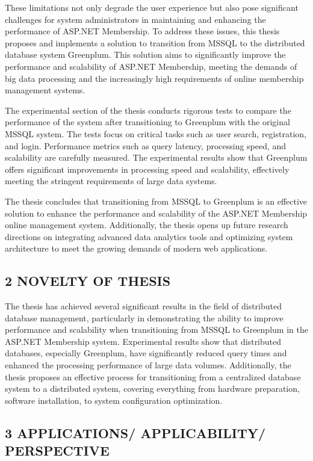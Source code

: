 \documentclass[50pt]{extarticle}
\begin{document}
These limitations not only degrade the user experience but also pose significant challenges for system administrators in maintaining and enhancing the performance of ASP.NET Membership. To address these issues, this thesis proposes and implements a solution to transition from MSSQL to the distributed database system Greenplum. This solution aims to significantly improve the performance and scalability of ASP.NET Membership, meeting the demands of big data processing and the increasingly high requirements of online membership management systems.

The experimental section of the thesis conducts rigorous tests to compare the performance of the system after transitioning to Greenplum with the original MSSQL system. The tests focus on critical tasks such as user search, registration, and login. Performance metrics such as query latency, processing speed, and scalability are carefully measured. The experimental results show that Greenplum offers significant improvements in processing speed and scalability, effectively meeting the stringent requirements of large data systems.

The thesis concludes that transitioning from MSSQL to Greenplum is an effective solution to enhance the performance and scalability of the ASP.NET Membership online management system. Additionally, the thesis opens up future research directions on integrating advanced data analytics tools and optimizing system architecture to meet the growing demands of modern web applications.


\subsection*{2 NOVELTY OF THESIS}
The thesis has achieved several significant results in the field of distributed database management, particularly in demonstrating the ability to improve performance and scalability when transitioning from MSSQL to Greenplum in the ASP.NET Membership system. Experimental results show that distributed databases, especially Greenplum, have significantly reduced query times and enhanced the processing performance of large data volumes. Additionally, the thesis proposes an effective process for transitioning from a centralized database system to a distributed system, covering everything from hardware preparation, software installation, to system configuration optimization.


\subsection*{3 APPLICATIONS/ APPLICABILITY/ PERSPECTIVE}
\end{document}

